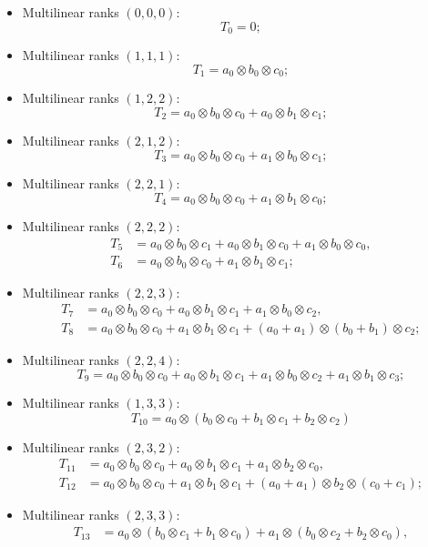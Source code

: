 \begin{itemize}
 \item Multilinear ranks $(0,0,0)$: 
 \[
  T_0 = 0;
 \]
\item Multilinear ranks $(1,1,1)$:
\[
T_1 = a_0 \otimes b_0 \otimes c_0;
\]
\item Multilinear ranks $(1,2,2)$:
\[
T_2 = a_0 \otimes b_0 \otimes c_0 + a_0 \otimes b_1 \otimes c_1;
\]
\item Multilinear ranks $(2,1,2)$:
\[
T_3 = a_0 \otimes b_0 \otimes c_0 + a_1 \otimes b_0 \otimes c_1;
\]
\item Multilinear ranks $(2,2,1)$:
\[
T_4 = a_0 \otimes b_0 \otimes c_0 + a_1 \otimes b_1 \otimes c_0;
\]
\item Multilinear ranks $(2,2,2)$:
\begin{align*}
T_5 &= a_0 \otimes b_0 \otimes c_1 + a_0 \otimes b_1 \otimes c_0 + a_1 \otimes b_0 \otimes c_0, \\
T_6 &= a_0 \otimes b_0 \otimes c_0 + a_1 \otimes b_1 \otimes c_1;
\end{align*}
\item Multilinear ranks $(2,2,3)$:
\begin{align*}
T_7 &= a_0 \otimes b_0 \otimes c_0 + a_0 \otimes b_1 \otimes c_1 + a_1 \otimes b_0 \otimes c_2, \\
T_8 &= a_0 \otimes b_0 \otimes c_0 + a_1 \otimes b_1 \otimes c_1 + (a_0 + a_1) \otimes (b_0 + b_1) \otimes c_2;
\end{align*}
\item Multilinear ranks $(2,2,4)$:
\[
T_9 = a_0 \otimes b_0 \otimes c_0 + a_0 \otimes b_1 \otimes c_1 + a_1 \otimes b_0 \otimes c_2 + a_1 \otimes b_1 \otimes c_3;
\]
\item Multilinear ranks $(1,3,3)$:
\[
T_{10} = a_0 \otimes (b_0 \otimes c_0 + b_1 \otimes c_1 + b_2 \otimes c_2)
\]
\item Multilinear ranks $(2,3,2)$:
\begin{align*}
T_{11} &= a_0 \otimes b_0 \otimes c_0 + a_0 \otimes b_1 \otimes c_1 + a_1 \otimes b_2 \otimes c_0, \\
T_{12} &= a_0 \otimes b_0 \otimes c_0 + a_1 \otimes b_1 \otimes c_1 + (a_0 + a_1) \otimes b_2 \otimes (c_0 + c_1);
\end{align*}
\item Multilinear ranks $(2,3,3)$:
\begin{align*}
T_{13} &= a_0 \otimes (b_0 \otimes c_1 + b_1 \otimes c_0) + a_1 \otimes (b_0 \otimes c_2 + b_2 \otimes c_0), \\

\end{align*}
\end{itemize}
